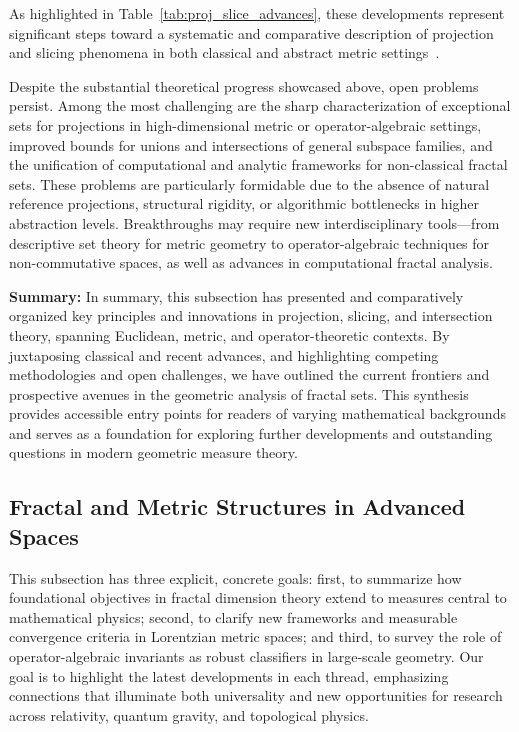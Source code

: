 \documentclass[sigconf]{acmart}
\begin{document}
As highlighted in Table~\ref{tab:proj_slice_advances}, these developments represent significant steps toward a systematic and comparative description of projection and slicing phenomena in both classical and abstract metric settings~\cite{ref74, ref43, ref75, ref1, ref6, ref23, ref30, ref92}.

Despite the substantial theoretical progress showcased above, open problems persist. Among the most challenging are the sharp characterization of exceptional sets for projections in high-dimensional metric or operator-algebraic settings, improved bounds for unions and intersections of general subspace families, and the unification of computational and analytic frameworks for non-classical fractal sets. These problems are particularly formidable due to the absence of natural reference projections, structural rigidity, or algorithmic bottlenecks in higher abstraction levels. Breakthroughs may require new interdisciplinary tools—from descriptive set theory for metric geometry to operator-algebraic techniques for non-commutative spaces, as well as advances in computational fractal analysis.

\textbf{Summary:} In summary, this subsection has presented and comparatively organized key principles and innovations in projection, slicing, and intersection theory, spanning Euclidean, metric, and operator-theoretic contexts. By juxtaposing classical and recent advances, and highlighting competing methodologies and open challenges, we have outlined the current frontiers and prospective avenues in the geometric analysis of fractal sets. This synthesis provides accessible entry points for readers of varying mathematical backgrounds and serves as a foundation for exploring further developments and outstanding questions in modern geometric measure theory.

\subsection{Fractal and Metric Structures in Advanced Spaces}

This subsection has three explicit, concrete goals: first, to summarize how foundational objectives in fractal dimension theory extend to measures central to mathematical physics; second, to clarify new frameworks and measurable convergence criteria in Lorentzian metric spaces; and third, to survey the role of operator-algebraic invariants as robust classifiers in large-scale geometry. Our goal is to highlight the latest developments in each thread, emphasizing connections that illuminate both universality and new opportunities for research across relativity, quantum gravity, and topological physics.
\end{document}

